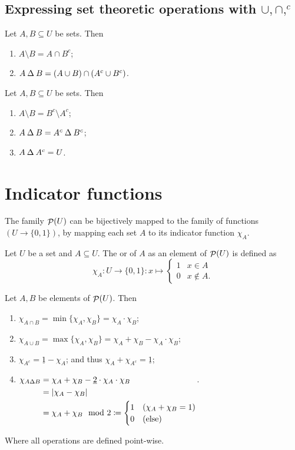 \subsection{Expressing set theoretic operations with $\cup,\cap, ^c$}
\begin{proposition}
Let $A,B\subseteq U$ be sets. Then
\begin{enumerate}
\item $A\setminus B = A \cap B^c$;
\item $A\mathbin{\Delta} B = (A\cup B)\cap (A^c\cup B^c)$.
\end{enumerate}
\end{proposition}
\begin{corollary}
Let $A,B \subseteq U$ be sets. Then
\begin{enumerate}
\item $A\setminus B = B^c\setminus A^c$;
\item $A \mathbin{\Delta} B = A^c \mathbin{\Delta} B^c$;
\item $A \mathbin{\Delta} A^c = U$.
\end{enumerate}
\end{corollary}


\section{Indicator functions}
The family $\mathop{\mathcal{P}}(U)$ can be bijectively mapped to the family of functions $(U\to \{0,1\})$, by mapping each set $A$ to its indicator function $\chi_A$.

\begin{definition}
Let $U$ be a set and $A\subseteq U$. The  or  of $A$ as an element of $\mathop{\mathcal{P}}(U)$ is defined as
\[ \chi_A: U\to \{0,1\}: x\mapsto \begin{cases}
1 & x\in A \\ 0 & x\notin A.
\end{cases} \]
\end{definition}
\begin{lemma}
Let $A,B$ be elements of $\mathop{\mathcal{P}}(U)$. Then
\begin{enumerate}
\item $\chi_{A\cap B} = \min\{\chi_A,\chi_B\} = \chi_A\cdot \chi_B$;
\item $\chi_{A\cup B} = \max\{\chi_A,\chi_B\} = \chi_A + \chi_B - \chi_A\cdot \chi_B$;
\item $\chi_{A^c} = \underline{1}-\chi_A$; and thus $\chi_A + \chi_{A^c} = \underline{1}$;
\item $\chi_{A\Delta B} \begin{aligned}[t] &= \chi_A + \chi_B - \underline{2}\cdot\chi_A\cdot \chi_B \\
&= |\chi_A - \chi_B| \\
&= \chi_A + \chi_B \mod 2 \coloneqq \begin{cases}
1 & (\chi_A + \chi_B = 1) \\
0 & \text{(else)}
\end{cases}
\end{aligned}$.
\end{enumerate}
Where all operations are defined point-wise.
\end{lemma}

